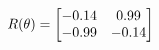\documentclass[preview]{standalone}
\begin{document}
\begin{align*}
\special{dvisvgm:raw <g id='unique000'>}R(\theta) = \begin{bmatrix}-0.14 & 0.99\\-0.99 & -0.14\end{bmatrix}\special{dvisvgm:raw </g>}
\end{align*}
\end{document}
